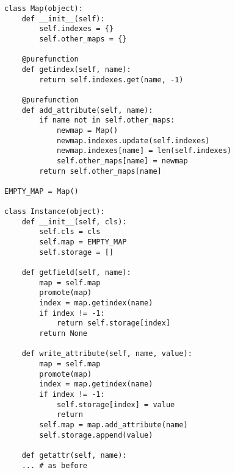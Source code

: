 \begin{lstlisting}[mathescape,basicstyle=\ttfamily]
class Map(object):
    def __init__(self):
        self.indexes = {}
        self.other_maps = {}

    @purefunction
    def getindex(self, name):
        return self.indexes.get(name, -1)

    @purefunction
    def add_attribute(self, name):
        if name not in self.other_maps:
            newmap = Map()
            newmap.indexes.update(self.indexes)
            newmap.indexes[name] = len(self.indexes)
            self.other_maps[name] = newmap
        return self.other_maps[name]

EMPTY_MAP = Map()

class Instance(object):
    def __init__(self, cls):
        self.cls = cls
        self.map = EMPTY_MAP
        self.storage = []

    def getfield(self, name):
        map = self.map
        promote(map)
        index = map.getindex(name)
        if index != -1:
            return self.storage[index]
        return None

    def write_attribute(self, name, value):
        map = self.map
        promote(map)
        index = map.getindex(name)
        if index != -1:
            self.storage[index] = value
            return
        self.map = map.add_attribute(name)
        self.storage.append(value)

    def getattr(self, name):
	... # as before
\end{lstlisting}
